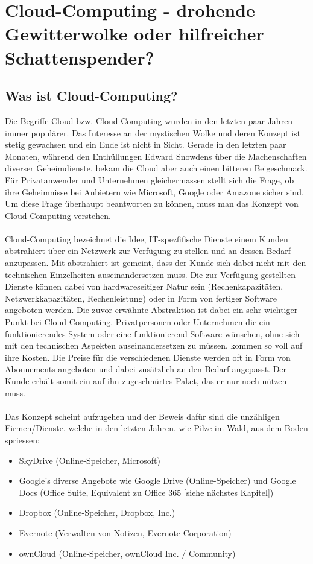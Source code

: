 \section{Cloud-Computing - drohende Gewitterwolke oder hilfreicher Schattenspender?}

\subsection{Was ist Cloud-Computing?}
Die Begriffe Cloud bzw. Cloud-Computing wurden in den letzten paar Jahren immer populärer. Das Interesse an der mystischen Wolke und deren Konzept ist stetig gewachsen und ein Ende ist nicht in Sicht. Gerade in den letzten paar Monaten, während den Enthüllungen Edward Snowdens über die Machenschaften diverser Geheimdienste, bekam die Cloud aber auch einen bitteren Beigeschmack. Für Privatanwender und Unternehmen gleichermassen stellt sich die Frage, ob ihre Geheimnisse bei Anbietern wie Microsoft, Google oder Amazone sicher sind. Um diese Frage überhaupt beantworten zu können, muss man das Konzept von Cloud-Computing verstehen.
\\
\\
Cloud-Computing bezeichnet die Idee, IT-spezfifische Dienste einem Kunden abstrahiert über ein Netzwerk zur Verfügung zu stellen und an dessen Bedarf anzupassen. Mit abstrahiert ist gemeint, dass der Kunde sich dabei nicht mit den technischen Einzelheiten auseinandersetzen muss. Die zur Verfügung gestellten Dienste können dabei von hardwareseitiger Natur sein (Rechenkapazitäten, Netzwerkkapazitäten, Rechenleistung) oder in Form von fertiger Software angeboten werden. Die zuvor erwähnte Abstraktion ist dabei ein sehr wichtiger Punkt bei Cloud-Computing. Privatpersonen oder Unternehmen die ein funktionierendes System oder eine funktionierend Software wünschen, ohne sich mit den technischen Aspekten auseinandersetzen zu müssen, kommen so voll auf ihre Kosten. Die Preise für die verschiedenen Dienste werden oft in Form von Abonnements angeboten und dabei zusätzlich an den Bedarf angepasst. Der Kunde erhält somit ein auf ihn zugeschnürtes Paket, das er nur noch nützen muss.
\\
\\
Das Konzept scheint aufzugehen und der Beweis dafür sind die unzähligen Firmen/Dienste, welche in den letzten Jahren, wie Pilze im Wald, aus dem Boden spriessen:
\begin{itemize}
\item SkyDrive (Online-Speicher, Microsoft)
\item Google's diverse Angebote wie Google Drive (Online-Speicher) und Google Docs (Office Suite, Equivalent zu Office 365 [siehe nächstes Kapitel])
\item Dropbox (Online-Speicher, Dropbox, Inc.)
\item Evernote (Verwalten von Notizen, Evernote Corporation)
\item ownCloud (Online-Speicher, ownCloud Inc. / Community)
\end{itemize}


